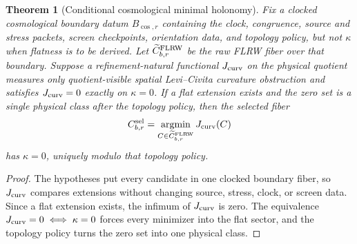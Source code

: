 \documentclass[11pt]{article}
\newtheorem{theorem}{Theorem}[section]
\begin{document}
\begin{theorem}[Conditional cosmological minimal holonomy]\label{thm:conditional-cmh}
Fix a clocked cosmological boundary datum \(B_{\cos,r}\) containing the clock, congruence, source
and stress packets, screen checkpoints, orientation data, and topology policy, but not \(\kappa\)
when flatness is to be derived. Let \(\widetilde C^{\rm FLRW}_{b,r}\) be the raw FLRW fiber over
that boundary. Suppose a refinement-natural functional \(J_{\rm curv}\) on the physical quotient
measures only quotient-visible spatial Levi--Civita curvature obstruction and satisfies
\(J_{\rm curv}=0\) exactly on \(\kappa=0\). If a flat extension exists and the zero set is a single
physical class after the topology policy, then the selected fiber
\[
C^{\rm sel}_{b,r}
=
\operatorname*{argmin}_{C\in\widetilde C^{\rm FLRW}_{b,r}}J_{\rm curv}(C)
\]
has \(\kappa=0\), uniquely modulo that topology policy.
\end{theorem}

\begin{proof}
The hypotheses put every candidate in one clocked boundary fiber, so \(J_{\rm curv}\) compares
extensions without changing source, stress, clock, or screen data. Since a flat extension exists,
the infimum of \(J_{\rm curv}\) is zero. The equivalence \(J_{\rm curv}=0\iff\kappa=0\) forces every
minimizer into the flat sector, and the topology policy turns the zero set into one physical class.
\end{proof}
\end{document}
